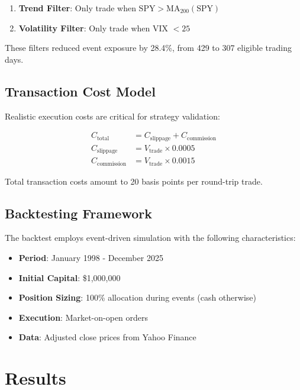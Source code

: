 \documentclass[twocolumn,ieee]{arithmaxresearch}
\begin{document}
\begin{enumerate}
    \item \textbf{Trend Filter}: Only trade when $\text{SPY} > \text{MA}_{200}(\text{SPY})$
    \item \textbf{Volatility Filter}: Only trade when VIX $< 25$
\end{enumerate}

These filters reduced event exposure by 28.4\%, from 429 to 307 eligible trading days.

\subsection{Transaction Cost Model}

Realistic execution costs are critical for strategy validation:

\begin{align}
C_{\text{total}} &= C_{\text{slippage}} + C_{\text{commission}} \\
C_{\text{slippage}} &= V_{\text{trade}} \times 0.0005 \\
C_{\text{commission}} &= V_{\text{trade}} \times 0.0015
\end{align}

Total transaction costs amount to 20 basis points per round-trip trade.

\subsection{Backtesting Framework}

The backtest employs event-driven simulation with the following characteristics:

\begin{itemize}
    \item \textbf{Period}: January 1998 - December 2025
    \item \textbf{Initial Capital}: \$1,000,000
    \item \textbf{Position Sizing}: 100\% allocation during events (cash otherwise)
    \item \textbf{Execution}: Market-on-open orders
    \item \textbf{Data}: Adjusted close prices from Yahoo Finance
\end{itemize}

\section{Results}
\end{document}

